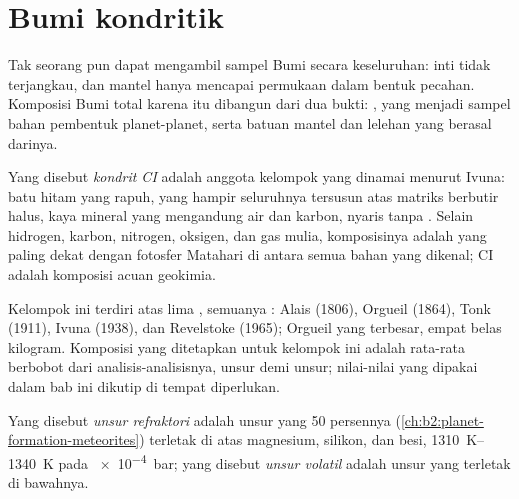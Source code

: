 \section{Bumi kondritik}

Tak seorang pun dapat mengambil sampel Bumi secara keseluruhan: inti tidak terjangkau, dan
mantel hanya mencapai permukaan dalam bentuk pecahan. Komposisi Bumi total
karena itu dibangun dari dua bukti: , yang menjadi sampel
bahan pembentuk planet-planet, serta batuan mantel dan
lelehan yang berasal darinya.

\begin{definition}[Kondrit CI]\label{def:b2:elements-in-the-earth:ci}
Yang disebut \emph{kondrit CI} adalah anggota kelompok
 yang dinamai menurut  Ivuna: batu hitam yang rapuh,
yang hampir seluruhnya tersusun atas matriks berbutir halus, kaya mineral yang mengandung air dan
karbon, nyaris tanpa . Selain hidrogen, karbon, nitrogen, oksigen, dan
gas mulia, komposisinya adalah yang paling dekat dengan fotosfer Matahari di antara semua bahan
yang dikenal;  CI adalah komposisi acuan geokimia.
\end{definition}

Kelompok ini terdiri atas lima , semuanya : Alais (1806), Orgueil
(1864), Tonk (1911), Ivuna (1938), dan Revelstoke (1965); Orgueil yang terbesar,
empat belas kilogram. Komposisi yang ditetapkan untuk kelompok ini adalah rata-rata berbobot
dari analisis-analisisnya, unsur demi unsur; nilai-nilai yang dipakai dalam bab ini
dikutip di tempat diperlukan.

\begin{definition}
\label{def:b2:elements-in-the-earth:volatility}
Yang disebut \emph{unsur refraktori} adalah unsur yang 
50 persennya (\cref{ch:b2:planet-formation-meteorites}) terletak di atas
 magnesium, silikon, dan besi, \qtyrange{1310}{1340}{K} pada
\qty{e-4}{bar}; yang disebut
\emph{unsur volatil} adalah unsur yang 
terletak di bawahnya.
\end{definition}

